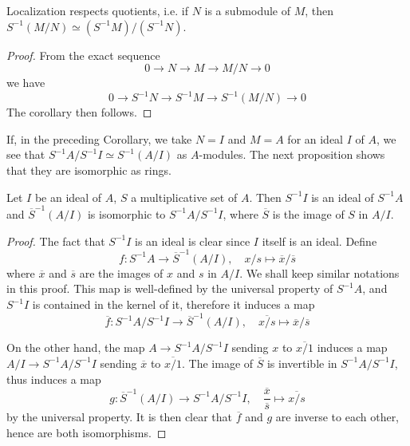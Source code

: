 \begin{lemma}
Localization respects quotients, i.e. if $N$ is a submodule of
$M$, then $S^{-1}(M/N)\simeq (S^{-1}M)/(S^{-1}N)$.
\end{lemma}

\begin{proof}
From the exact sequence
$$
0 \longrightarrow N \longrightarrow M \longrightarrow M/N \longrightarrow 0
$$
we have
$$
0 \longrightarrow S^{-1}N \longrightarrow S^{-1}M
\longrightarrow S^{-1}(M/N) \longrightarrow 0
$$
The corollary then follows.
\end{proof}

\noindent
If, in the preceding Corollary, we take $N = I$ and $M = A$ for an ideal $I$ of
$A$, we see that $S^{-1}A/S^{-1}I \simeq S^{-1}(A/I)$ as $A$-modules. The next
proposition shows that they are isomorphic as rings.

\begin{proposition}
\label{proposition-localize-quotient}
Let $I$ be an ideal of $A$, $S$ a multiplicative set of $A$. Then
$S^{-1}I$ is an ideal of $S^{-1}A$ and $\overline{S}^{-1}(A/I)$ is
isomorphic to $S^{-1}A/S^{-1}I$, where $\overline{S}$ is
the image of $S$ in $A/I$.
\end{proposition}

\begin{proof}
The fact that $S^{-1}I$ is an ideal is clear since $I$ itself is an
ideal. Define
$$
f : S^{-1}A\longrightarrow \overline{S}^{-1}(A/I), \quad x/s\mapsto
\overline{x}/\overline{s}
$$
where $\overline{x}$ and $\overline{s}$ are the images of $x$ and
$s$ in $A/I$. We shall keep similar notations in this proof.
This map is well-defined by the universal property of
$S^{-1}A$, and $S^{-1}I$ is contained in the kernel of it,
therefore it induces a map
$$
\overline{f} : S^{-1}A/S^{-1}I \longrightarrow \overline{S}^{-1}(A/I), \quad
\overline{x/s}\mapsto \overline{x}/\overline{s}
$$

\medskip\noindent
On the other hand, the map $A\rightarrow S^{-1}A/S^{-1}I$ sending $x$ to
$\overline{x/1}$ induces a map $A/I \rightarrow S^{-1}A/S^{-1}I$ sending
$\overline{x}$ to $\overline{x/1}$. The image of $\overline{S}$ is
invertible in $S^{-1}A/S^{-1}I$, thus induces a map
$$
g : \overline{S}^{-1}(A/I) \longrightarrow S^{-1}A/S^{-1}I, \quad
\frac{\overline{x}}{\overline{s}}\mapsto \overline{x/s}
$$
by the universal property. It is then clear that $\overline{f}$ and $g$
are inverse to each other, hence are both isomorphisms.
\end{proof}

